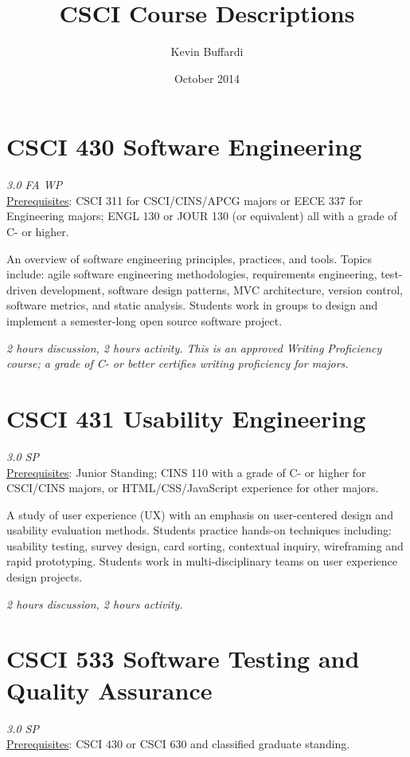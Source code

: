 \documentclass[12pt]{article}
\title{CSCI Course Descriptions}
\author{Kevin Buffardi}
\date{October 2014}
\begin{document}
  \maketitle
  \section*{CSCI 430 Software Engineering}	 	
  \textit{3.0 FA WP} \\
  \underline{Prerequisites}: CSCI 311 for CSCI/CINS/APCG majors or EECE 337 for Engineering majors; ENGL 130 or JOUR 130 (or equivalent) all with a grade of C- or higher.

  An overview of software engineering principles, practices, and tools. Topics include: agile software engineering methodologies, requirements engineering, test-driven development, software design patterns, MVC architecture, version control, software metrics, and static analysis. Students work in groups to design and implement a semester-long open source software project. 

  \textit{2 hours discussion, 2 hours activity. This is an approved Writing Proficiency course; a grade of C- or better certifies writing proficiency for majors.}
  
  \section*{CSCI 431 Usability Engineering}
  \textit{3.0 SP} \\
  \underline{Prerequisites}: Junior Standing; CINS 110 with a grade of C- or higher for CSCI/CINS majors, or HTML/CSS/JavaScript experience for other majors.

  A study of user experience (UX) with an emphasis on user-centered design and usability evaluation methods. Students practice hands-on techniques including: usability testing, survey design, card sorting, contextual inquiry, wireframing and rapid prototyping. Students work in multi-disciplinary teams on user experience design projects.

  \textit{2 hours discussion, 2 hours activity.}

  \section*{CSCI 533 Software Testing and Quality Assurance}
  \textit{3.0 SP} \\
  \underline{Prerequisites}: CSCI 430 or CSCI 630 and classified graduate standing.
\end{document}
